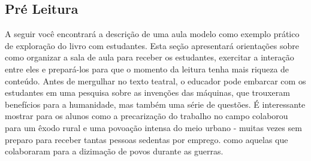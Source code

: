 \documentclass[11pt]{extarticle}
\begin{document}
\subsection{Pré Leitura}

A seguir você encontrará a descrição de uma aula modelo como exemplo prático de exploração do livro com estudantes. Esta seção apresentará orientações sobre como organizar a sala de aula para receber os estudantes, exercitar a interação entre eles e prepará-los para que o momento da leitura tenha mais riqueza de conteúdo.
Antes de mergulhar no texto teatral, o educador pode embarcar com os estudantes em uma pesquisa sobre as invenções das máquinas, que trouxeram benefícios para a humanidade, mas também uma série de questões. É interessante mostrar para os alunos como a precarização do trabalho no campo colaborou para um êxodo rural e uma povoação intensa do meio urbano - muitas vezes sem preparo para receber tantas pessoas sedentas por emprego. como aquelas que colaboraram para a dizimação de povos durante as guerras. 

\end{document}
